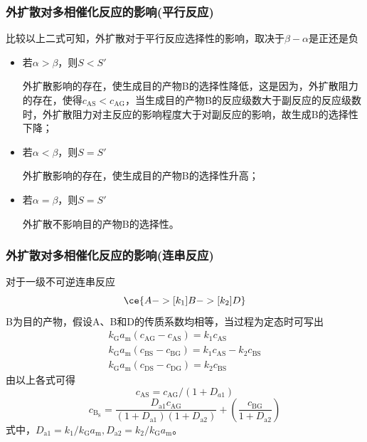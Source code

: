 \documentclass[dvipsnames, svgnames, x11names]{beamer}
\begin{document}
\begin{frame}
    \frametitle{外扩散对多相催化反应的影响(平行反应)}

    比较以上二式可知，外扩散对于平行反应选择性的影响，取决于$\beta - \alpha$是正还是负
    \begin{itemize}
        \item 若$\alpha > \beta$，则$S < S'$
        
        外扩散影响的存在，使生成目的产物B的选择性降低，这是因为，外扩散阻力的存在，使得$c_\mathrm{AS} < c_\mathrm{AG}$，当生成目的产物B的反应级数大于副反应的反应级数时，外扩散阻力对主反应的影响程度大于对副反应的影响，故生成B的选择性下降；
        \item 若$\alpha < \beta$，则$S = S'$
        
        外扩散影响的存在，使生成目的产物B的选择性升高；
        \item 若$\alpha = \beta$，则$S = S'$
        
        外扩散不影响目的产物B的选择性。
    \end{itemize}

\end{frame}


\begin{frame}
    \frametitle{外扩散对多相催化反应的影响(连串反应)}

    对于一级不可逆连串反应
    \[
        \ce{A ->[k_1] B ->[k_2] D}
    \]
    B为目的产物，假设A、B和D的传质系数均相等，当过程为定态时可写出
    \[
        \begin{array}{l}
            k_{\mathrm{G}} a_{\mathrm{m}}\left(c_{\mathrm{AG}}-c_{\mathrm{AS}}\right)=k_{1} c_{\mathrm{AS}} \\
            k_{\mathrm{G}} a_{\mathrm{m}}\left(c_{\mathrm{BS}}-c_{\mathrm{BG}}\right)=k_{1} c_{\mathrm{AS}}-k_{2} c_{\mathrm{BS}} \\
            k_{\mathrm{G}} a_{\mathrm{m}}\left(c_{\mathrm{DS}}-c_{\mathrm{DG}}\right)=k_{2} c_{\mathrm{BS}}
            \end{array}
    \]
    由以上各式可得
    \[
        c_{\mathrm{AS}}=c_{\mathrm{AG}} /\left(1+D_{a 1}\right)
    \]
    \[
        c_{\mathrm{B}_{\mathrm{S}}}=\frac{D_{\mathrm{a} 1} c_{\mathrm{AG}}}{\left(1+D_{\mathrm{a} 1}\right)\left(1+D_{\mathrm{a} 2}\right)}+\left(\frac{c_{\mathrm{BG}}}{1+D_{\mathrm{a} 2}}\right)
    \]
    式中，$D_{\mathrm{a} 1}=k_{1} / k_{\mathrm{G}} a_{\mathrm{m}}, D_{\mathrm{a} 2}=k_{2} / k_{\mathrm{G}} a_{\mathrm{m}} $。

\end{frame}
\end{document}
